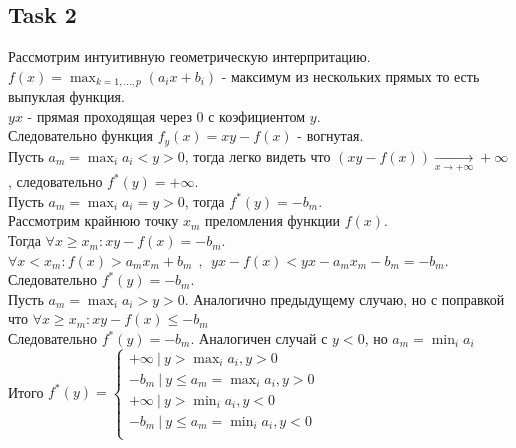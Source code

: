 \documentclass[12pt]{exam}
\begin{document}
\subsection*{Task 2}
Рассмотрим интуитивную геометрическую интерпритацию. \\
$f(x) = \max_{k=1, \ldots, p} (a_i x + b_i)$ - максимум из нескольких прямых то есть выпуклая функция. \\
$yx$ - прямая проходящая через 0 с коэфициентом $y$. \\
Следовательно функция $f_y(x) = xy - f(x)$ - вогнутая. \\
Пусть $a_m = \max_i a_i < y > 0$, тогда легко видеть что 
$(xy - f(x)) \xrightarrow[x \rightarrow +\infty]{} +\infty$, 
следовательно $f^*(y) = + \infty$. \\
Пусть $a_m = \max_i a_i = y > 0$, тогда $f^*(y) = -b_m$. \\
Рассмотрим крайнюю точку $x_m$ преломления функции $f(x)$. \\
Тогда $\forall x \geq x_m: xy - f(x) = -b_m$. \\
$\forall x < x_m: f(x) > a_m x_m + b_m \:\:,\:\:  yx - f(x) < yx - a_m x_m - b_m = -b_m$.\\
Следовательно $f^*(y) = -b_m$.\\
Пусть $a_m = \max_i a_i > y > 0$. 
Аналогично предыдущему случаю, но с поправкой что $\forall x \geq x_m: xy - f(x) \leq -b_m$ \\
Следовательно $f^*(y) = -b_m$. Аналогичен случай с $y < 0$, но $a_m = \min_i a_i$\\
Итого $f^*(y) = \begin{cases}
    + \infty \: | \: y > \max_i a_i, y > 0 \\
    -b_m \: | \: y \leq a_m = \max_i a_i, y > 0 \\ 
    + \infty \: | \: y > \min_i a_i, y < 0 \\
    -b_m \: | \: y \leq a_m = \min_i a_i, y < 0 \\
\end{cases}$
\end{document}
